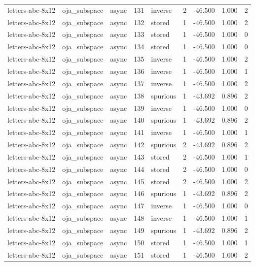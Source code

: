\begin{tabular}{lllrlrrrr}
letters-abc-8x12 & oja\_subspace & async & 131 & inverse & 2 & -46.500 & 1.000 & 2 \\
letters-abc-8x12 & oja\_subspace & async & 132 & stored & 1 & -46.500 & 1.000 & 2 \\
letters-abc-8x12 & oja\_subspace & async & 133 & stored & 1 & -46.500 & 1.000 & 0 \\
letters-abc-8x12 & oja\_subspace & async & 134 & stored & 1 & -46.500 & 1.000 & 0 \\
letters-abc-8x12 & oja\_subspace & async & 135 & inverse & 1 & -46.500 & 1.000 & 2 \\
letters-abc-8x12 & oja\_subspace & async & 136 & inverse & 1 & -46.500 & 1.000 & 1 \\
letters-abc-8x12 & oja\_subspace & async & 137 & inverse & 1 & -46.500 & 1.000 & 2 \\
letters-abc-8x12 & oja\_subspace & async & 138 & spurious & 1 & -43.692 & 0.896 & 2 \\
letters-abc-8x12 & oja\_subspace & async & 139 & inverse & 1 & -46.500 & 1.000 & 0 \\
letters-abc-8x12 & oja\_subspace & async & 140 & spurious & 1 & -43.692 & 0.896 & 2 \\
letters-abc-8x12 & oja\_subspace & async & 141 & inverse & 1 & -46.500 & 1.000 & 1 \\
letters-abc-8x12 & oja\_subspace & async & 142 & spurious & 2 & -43.692 & 0.896 & 2 \\
letters-abc-8x12 & oja\_subspace & async & 143 & stored & 2 & -46.500 & 1.000 & 1 \\
letters-abc-8x12 & oja\_subspace & async & 144 & stored & 2 & -46.500 & 1.000 & 0 \\
letters-abc-8x12 & oja\_subspace & async & 145 & stored & 2 & -46.500 & 1.000 & 2 \\
letters-abc-8x12 & oja\_subspace & async & 146 & spurious & 1 & -43.692 & 0.896 & 2 \\
letters-abc-8x12 & oja\_subspace & async & 147 & inverse & 1 & -46.500 & 1.000 & 0 \\
letters-abc-8x12 & oja\_subspace & async & 148 & inverse & 1 & -46.500 & 1.000 & 1 \\
letters-abc-8x12 & oja\_subspace & async & 149 & spurious & 1 & -43.692 & 0.896 & 2 \\
letters-abc-8x12 & oja\_subspace & async & 150 & stored & 1 & -46.500 & 1.000 & 1 \\
letters-abc-8x12 & oja\_subspace & async & 151 & stored & 1 & -46.500 & 1.000 & 2 \\

\end{tabular}
